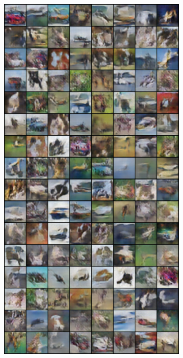 \begin{figure}[H]
    \begin{subfigure}{0.2\textwidth}
        \centering
        \includegraphics[width=0.95\linewidth]{cifar10/64_nz100/fake_sample_epoch_0015.png}
        \caption{}
        \label{subfig:cifar10/64_nz100/fake_sample_epoch_0015}
    \end{subfigure}%
    \begin{subfigure}{0.2\textwidth}

\end{subfigure}
\end{figure}
